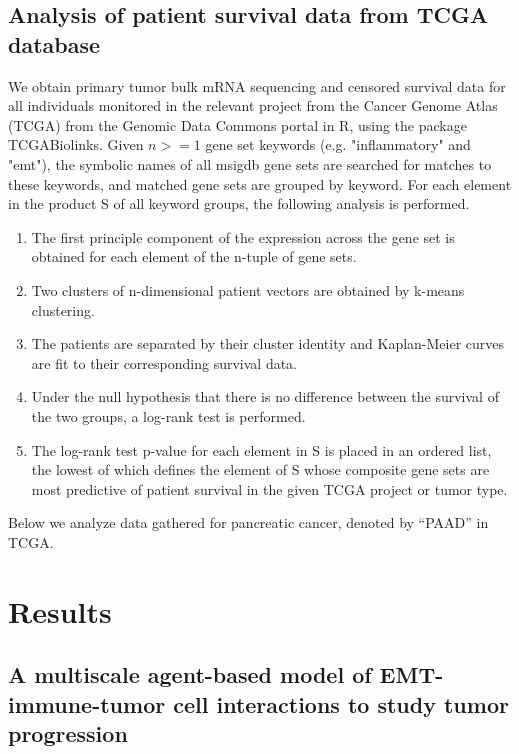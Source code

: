 \documentclass[11pt]{article}
\begin{document}
\subsection{Analysis of patient survival data from TCGA database}
We obtain primary tumor bulk mRNA sequencing and censored survival data for all individuals monitored in the relevant project from the Cancer Genome Atlas (TCGA) from the Genomic Data Commons portal in R, using the package TCGABiolinks.  Given $n >= 1$ gene set keywords (e.g. "inflammatory" and "emt"), the symbolic names of all msigdb gene sets are searched for matches to these keywords, and matched gene sets are grouped by keyword. For each element in the product S of all keyword groups, the following analysis is performed.
\begin{enumerate}
     \item The first principle component of the expression across the gene set is obtained for each element of the n-tuple of gene sets.
     \item Two clusters of n-dimensional patient vectors are obtained by k-means clustering.
     \item The patients are separated by their cluster identity and Kaplan-Meier curves are fit to their corresponding survival data.
     \item Under the null hypothesis that there is no difference between the survival of the two groups, a log-rank test is performed.
     \item The log-rank test p-value for each element in S is placed in an ordered list, the lowest of which defines the element of S whose composite gene sets are most predictive of patient survival in the given TCGA project or tumor type.
\end{enumerate}
Below we analyze data gathered for pancreatic cancer, denoted by ``PAAD'' in TCGA.     


\section{Results}

\subsection{A multiscale agent-based model of EMT-immune-tumor cell interactions to study tumor progression}\label{ExplModel}
\end{document}
